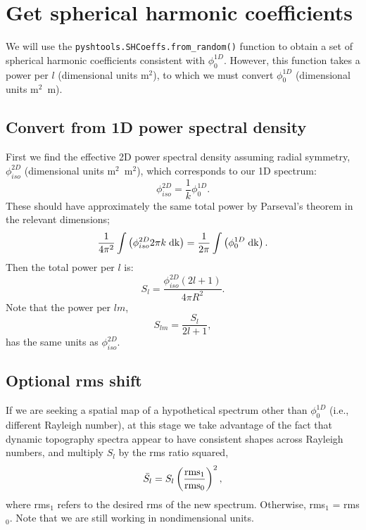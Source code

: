 \documentclass[10pt]{article}
\begin{document}
\section{Get spherical harmonic coefficients}

We will use the {\tt pyshtools.SHCoeffs.from{\_}random()} function to obtain a set of spherical harmonic coefficients consistent with $\phi^{1D}_0$. However, this function takes a power per $l$ (dimensional units m$^2$), to which we must convert  $\phi^{1D}_0$ (dimensional units m$^2$~m).

\subsection{Convert from 1D power spectral density}

First we find the effective 2D power spectral density assuming radial symmetry, $\phi^{2D}_{iso}$ (dimensional units m$^2$~m$^2$), which corresponds to our 1D spectrum:
\begin{equation}
\phi^{2D}_{iso} = \frac{1}{k} \phi^{1D}_0.
\end{equation}
These should have approximately the same total power by Parseval's theorem in the relevant dimensions;
\begin{equation}
\frac{1}{4\pi^2}\int\left(\phi^{2D}_{iso}2\pi k \; \rm{d}k \right) = \frac{1}{2\pi}\int\left(\phi^{1D}_0 \; \rm{d}k \right).
\end{equation}
Then the total power per $l$ is:
\begin{equation}
S_l = \frac{\phi^{2D}_{iso} \left(2 l + 1\right)}{4 \pi R^2}.
\end{equation}
Note that the power per $lm$,
\begin{equation}
S_{lm} = \frac{S_l}{2l + 1},
\end{equation}
has the same units as $\phi^{2D}_{iso}$.

\subsection{Optional rms shift} If we are seeking a spatial map of a hypothetical spectrum other than $\phi^{1D}_0$ (i.e., different Rayleigh number), at this stage we take advantage of the fact that dynamic topography spectra appear to have consistent shapes across Rayleigh numbers, and multiply $S_l$ by the rms ratio squared, 
\begin{equation}
\bar{S_l} = S_l \left(\frac{\rm{rms}_1}{\rm{rms}_0}\right)^2,
\end{equation}
where rms$_1$ refers to the desired rms of the new spectrum. Otherwise, rms$_1$ = rms$_0$. Note that we are still working in nondimensional units.
\end{document}
